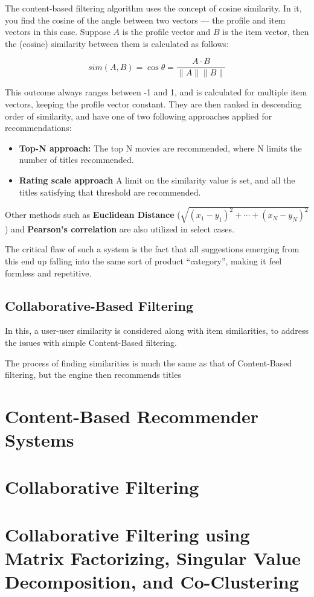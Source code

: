\documentclass{article}
\begin{document}
\medskip

\noindent The content-based filtering algorithm uses the concept of cosine similarity. In it, you find the cosine of the angle between two vectors — the profile and item vectors in this case. Suppose \( A \) is the profile vector and \( B \) is the item vector, then the (cosine) similarity between them is calculated as follows:

$$ sim(A, B) = \cos{\theta} = \frac{A \cdot B}{\|A\| \|B\|} $$

\noindent This outcome always ranges between -1 and 1, and is calculated for multiple item vectors, keeping the profile vector constant. They are then ranked in descending order of similarity, and have one of two following approaches applied for recommendations:

\begin{itemize}
    \item{\textbf{Top-N approach:} The top N movies are recommended, where N limits the number of titles recommended.}
    \item{\textbf{Rating scale approach} A limit on the similarity value is set, and all the titles satisfying that threshold are recommended.}
\end{itemize}

\noindent Other methods such as \textbf{Euclidean Distance} ($ \sqrt{(x_1 - y_1) ^ 2 + \cdots + (x_N - y_N) ^ 2} $) and \textbf{Pearson’s correlation} are also utilized in select cases.

\medskip

\noindent The critical flaw of such a system is the fact that all suggestions emerging from this end up falling into the same sort of product ``category'', making it feel formless and repetitive.

\subsection{Collaborative-Based Filtering}

In this, a user-user similarity is considered along with item similarities, to address the issues with simple Content-Based filtering.

\medskip

\noindent The process of finding similarities is much the same as that of Content-Based filtering, but the engine then recommends titles

\section{Content-Based Recommender Systems}
\section{Collaborative Filtering}
\section{Collaborative Filtering using Matrix Factorizing, Singular Value Decomposition, and Co-Clustering}
\end{document}
